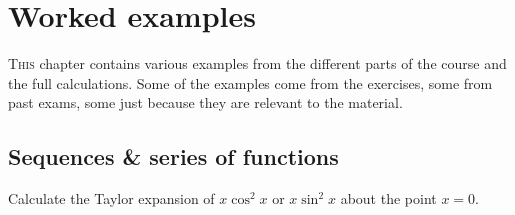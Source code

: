 \chapter{Worked examples}

\lettrine{T}{his} chapter contains various examples from the different parts of the course and the full calculations.
Some of the examples come from the exercises, some from past exams, some just because they are relevant to the material.

\section{Sequences \& series of functions}

\begin{task}
    Calculate the Taylor expansion of
    \(x\cos^2 x\) or \(x\sin^2 x\)
    about the point \(x=0\).
\end{task}

